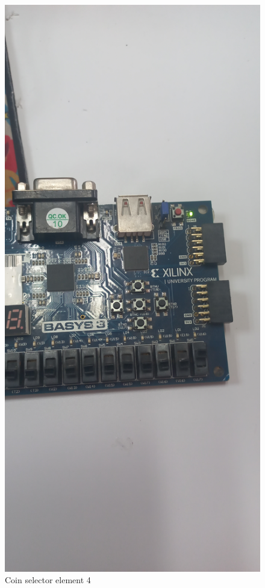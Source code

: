 \documentclass{article}
\begin{document}
\begin{multicols}{2}
	\begin{figure}[H]
		\centering
		\includegraphics[width=1\linewidth]{images/diagrams/coin-selector/coin-selector4.jpg}
		\caption{Coin selector element 4}
		\label{Coin selector element 4 Apendix}
	\end{figure}


\end{multicols}
\end{document}
